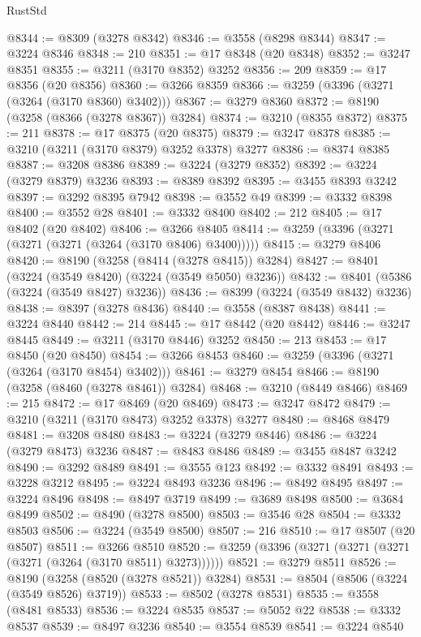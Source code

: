\begin{lexlean}{RustStd}
\begin{coremodule}
@8344 := @8309 (@3278 @8342)
@8346 := @3558 (@8298 @8344)
@8347 := @3224 @8346
@8348 := 210
@8351 := @17 @8348 (@20 @8348)
@8352 := @3247 @8351
@8355 := @3211 (@3170 @8352) @3252
@8356 := 209
@8359 := @17 @8356 (@20 @8356)
@8360 := @3266 @8359
@8366 := @3259 (@3396 (@3271 (@3264 (@3170 @8360) @3402)))
@8367 := @3279 @8360
@8372 := @8190 (@3258 (@8366 (@3278 @8367)) @3284)
@8374 := @3210 (@8355 @8372)
@8375 := 211
@8378 := @17 @8375 (@20 @8375)
@8379 := @3247 @8378
@8385 := @3210 (@3211 (@3170 @8379) @3252 @3378) @3277
@8386 := @8374 @8385
@8387 := @3208 @8386
@8389 := @3224 (@3279 @8352)
@8392 := @3224 (@3279 @8379) @3236
@8393 := @8389 @8392
@8395 := @3455 @8393 @3242
@8397 := @3292 @8395 @7942
@8398 := @3552 @49
@8399 := @3332 @8398
@8400 := @3552 @28
@8401 := @3332 @8400
@8402 := 212
@8405 := @17 @8402 (@20 @8402)
@8406 := @3266 @8405
@8414 := @3259 (@3396 (@3271 (@3271 (@3271 (@3264 (@3170 @8406) @3400)))))
@8415 := @3279 @8406
@8420 := @8190 (@3258 (@8414 (@3278 @8415)) @3284)
@8427 := @8401 (@3224 (@3549 @8420) (@3224 (@3549 @5050) @3236))
@8432 := @8401 (@5386 (@3224 (@3549 @8427) @3236))
@8436 := @8399 (@3224 (@3549 @8432) @3236)
@8438 := @8397 (@3278 @8436)
@8440 := @3558 (@8387 @8438)
@8441 := @3224 @8440
@8442 := 214
@8445 := @17 @8442 (@20 @8442)
@8446 := @3247 @8445
@8449 := @3211 (@3170 @8446) @3252
@8450 := 213
@8453 := @17 @8450 (@20 @8450)
@8454 := @3266 @8453
@8460 := @3259 (@3396 (@3271 (@3264 (@3170 @8454) @3402)))
@8461 := @3279 @8454
@8466 := @8190 (@3258 (@8460 (@3278 @8461)) @3284)
@8468 := @3210 (@8449 @8466)
@8469 := 215
@8472 := @17 @8469 (@20 @8469)
@8473 := @3247 @8472
@8479 := @3210 (@3211 (@3170 @8473) @3252 @3378) @3277
@8480 := @8468 @8479
@8481 := @3208 @8480
@8483 := @3224 (@3279 @8446)
@8486 := @3224 (@3279 @8473) @3236
@8487 := @8483 @8486
@8489 := @3455 @8487 @3242
@8490 := @3292 @8489
@8491 := @3555 @123
@8492 := @3332 @8491
@8493 := @3228 @3212
@8495 := @3224 @8493 @3236
@8496 := @8492 @8495
@8497 := @3224 @8496
@8498 := @8497 @3719
@8499 := @3689 @8498
@8500 := @3684 @8499
@8502 := @8490 (@3278 @8500)
@8503 := @3546 @28
@8504 := @3332 @8503
@8506 := @3224 (@3549 @8500)
@8507 := 216
@8510 := @17 @8507 (@20 @8507)
@8511 := @3266 @8510
@8520 := @3259 (@3396 (@3271 (@3271 (@3271 (@3271 (@3264 (@3170 @8511) @3273))))))
@8521 := @3279 @8511
@8526 := @8190 (@3258 (@8520 (@3278 @8521)) @3284)
@8531 := @8504 (@8506 (@3224 (@3549 @8526) @3719))
@8533 := @8502 (@3278 @8531)
@8535 := @3558 (@8481 @8533)
@8536 := @3224 @8535
@8537 := @5052 @22
@8538 := @3332 @8537
@8539 := @8497 @3236
@8540 := @3554 @8539
@8541 := @3224 @8540

\end{coremodule}
\end{lexlean}
